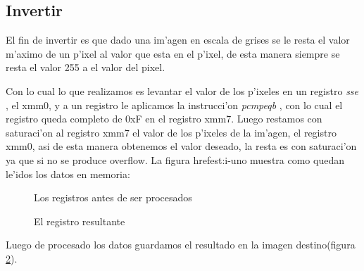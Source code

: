 \subsection{Invertir}
El fin de invertir es que dado una im'agen en escala de grises se le resta el valor m'aximo de un p'ixel al valor que esta en el p'ixel, de esta manera siempre se resta el valor 255 a el valor del pixel.

Con lo cual lo que realizamos es levantar el valor de los p'ixeles en un registro \textit{sse} , el xmm0, y a un registro le aplicamos la instrucci'on \textit{pcmpeqb} , con lo cual el registro queda completo de 0xF en el registro xmm7.
Luego restamos con saturaci'on al registro xmm7 el valor de los p'ixeles de la im'agen, el registro xmm0, asi de esta manera obtenemos el valor deseado, la resta es con saturaci'on ya que si no se produce overflow.
La figura href{est:i-uno} muestra como quedan le'idos los datos en memoria:

\begin{figure}[ht]
\caption{Los registros antes de ser procesados}
\label{est:i-uno}
\end{figure}

\begin{figure}[ht]
\caption{El registro resultante}
\label{est:i-dos}
\end{figure}

Luego de procesado los datos guardamos el resultado en la imagen destino(figura \ref{est:i-dos}).
